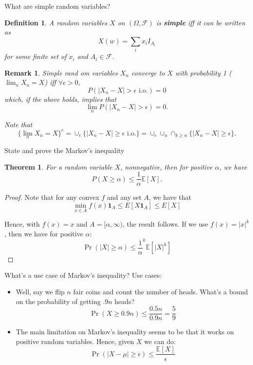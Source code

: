 \documentclass[avery5388,grid,frame]{flashcards}
\newcommand{\E}{\mathbb{E}}
\newcommand{\F}{\mathcal F}
\newtheorem*{theorem}{Theorem}
\newtheorem*{definition}{Definition}
\newtheorem*{remark}{Remark}
\begin{document}
\begin{flashcard}
    {What are simple random variables?}
    \begin{definition}
        A random variables $X$ on $(\Omega, \F)$ is \textbf{simple} iff it can be written as
        $$X(w) = \sum_i x_i I_{A_i}$$
        for some finite set of $x_i$ and $A_i \in \F$.
    \end{definition}

    \begin{remark}
        Simple rand om variables $X_n$ converge to $X$ with probability 1 ($\lim_n X_n = X$) iff $\forall \epsilon > 0$,
        $$P(|X_n - X| > \epsilon \text{ i.o.}) = 0$$
        which, if the above holds, implies that
        $$\lim_n P(|X_n - X| > \epsilon) = 0.$$

        Note that
        $$\{ \lim_n X_n = X \}^c = \cup_\epsilon \{ | X_n - X | \geq \epsilon \text{ i.o.} \} = \cup_\epsilon \cup_n \cap_{k \geq n} \{ |X_n - X| \geq \epsilon \}.$$
    \end{remark}
\end{flashcard}


\begin{flashcard}
    {State and prove the Markov's inequality}
    \begin{theorem}
        For a random variable $X$, nonnegative, then for positive $\alpha$, we have
        $$P(X \geq \alpha) \leq \frac 1 \alpha \E[X].$$
    \end{theorem}

    \begin{proof}
        Note that for any convex $f$ and any set $A$, we have that
        $$\min_{x \in A} f(x) \mathbf 1_{A} \leq E[X \mathbf 1_{A}] \leq E[X]$$

        Hence, with $f(x) = x$ and $A = [\alpha,\infty)$, the result follows. If we use $f(x) = |x|^k$, then we have for positive $\alpha$:
        $$\Pr(|X| \geq \alpha) \leq \frac 1 \alpha^k \E[|X|^k]$$
    \end{proof}
\end{flashcard}


\begin{flashcard}
    {What's a use case of Markov's inequality?}
    Use cases:
    \begin{itemize}
        \item Well, say we flip $n$ fair coins and count the number of heads. What's a bound on the probability of getting $.9n$ heads?
        $$\Pr(X \geq 0.9n) \leq \frac {0.5n}{0.9n} = \frac 5 9$$
        \item The main limitation on Markov's inequality seems to be that it works on positive random variables. Hence, given $X$ we can do:
        $$\Pr(|X - \mu| \geq \epsilon) \leq \frac{\E[X]}{\epsilon}$$
    \end{itemize}
\end{flashcard}
\end{document}
